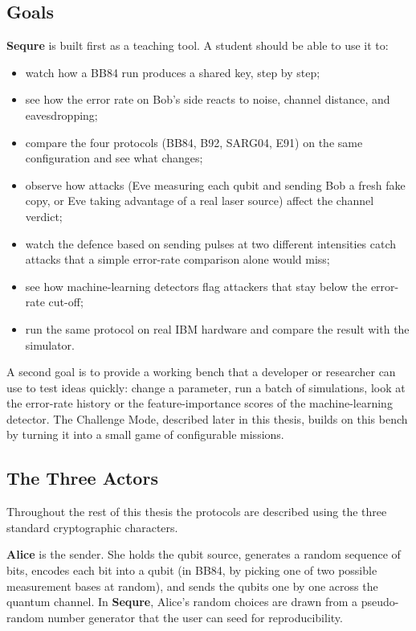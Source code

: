 \documentclass[12pt, a4paper]{article}
\begin{document}
\subsection{Goals}
\label{sec:goals}

\textbf{Sequre} is built first as a teaching tool. A student
should be able to use it to:

\begin{itemize}
  \item watch how a BB84 run produces a shared key, step by step;
  \item see how the error rate on Bob's side reacts to noise, channel distance, and
        eavesdropping;
  \item compare the four protocols (BB84, B92, SARG04, E91) on
        the same configuration and see what changes;
  \item observe how attacks (Eve measuring each qubit and sending Bob a fresh fake copy, or Eve taking advantage of a real laser source) affect the channel verdict;
  \item watch the defence based on sending pulses at two different intensities catch attacks that a simple error-rate comparison alone would miss;
  \item see how machine-learning detectors flag attackers that
        stay below the error-rate cut-off;
  \item run the same protocol on real IBM hardware and compare
        the result with the simulator.
\end{itemize}

A second goal is to provide a working bench that a developer or
researcher can use to test ideas quickly: change a parameter,
run a batch of simulations, look at the error-rate history or the
feature-importance scores of the machine-learning detector. The
Challenge Mode, described later in this thesis, builds on this
bench by turning it into a small game of configurable missions.

\subsection{The Three Actors}
\label{sec:actors}

Throughout the rest of this thesis the protocols are described
using the three standard cryptographic characters.

\textbf{Alice} is the sender. She holds the qubit source,
generates a random sequence of bits, encodes each bit into a
qubit (in BB84, by picking one of two possible measurement bases at random), and sends the qubits one by one across the
quantum channel. In \textbf{Sequre}, Alice's random choices are
drawn from a pseudo-random number generator that the user can
seed for reproducibility.
\end{document}
